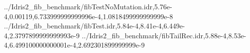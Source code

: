 \documentclass[
]{article}
\newenvironment{Shaded}{}{}
\newcommand{\DataTypeTok}[1]{\textcolor[rgb]{0.56,0.13,0.00}{#1}}
\newcommand{\FloatTok}[1]{\textcolor[rgb]{0.25,0.63,0.44}{#1}}
\newcommand{\NormalTok}[1]{#1}
\newcommand{\OperatorTok}[1]{\textcolor[rgb]{0.40,0.40,0.40}{#1}}
\begin{document}
\begin{Shaded}
\begin{Highlighting}[]
\OperatorTok{../}\DataTypeTok{Idris2\_fib\_benchmark}\OperatorTok{/}\NormalTok{fibTestNoMutation}\OperatorTok{.}\NormalTok{idr,}\FloatTok{5.76e{-}4}\NormalTok{,}\FloatTok{0.00119}\NormalTok{,}\FloatTok{6.733999999999996e{-}4}\NormalTok{,}\FloatTok{1.0818499999999999e{-}8}
\OperatorTok{../}\DataTypeTok{Idris2\_fib\_benchmark}\OperatorTok{/}\NormalTok{fibTest}\OperatorTok{.}\NormalTok{idr,}\FloatTok{5.84e{-}4}\NormalTok{,}\FloatTok{8.41e{-}4}\NormalTok{,}\FloatTok{6.449e{-}4}\NormalTok{,}\FloatTok{2.3797899999999993e{-}9}
\OperatorTok{../}\DataTypeTok{Idris2\_fib\_benchmark}\OperatorTok{/}\NormalTok{fibTailRec}\OperatorTok{.}\NormalTok{idr,}\FloatTok{5.88e{-}4}\NormalTok{,}\FloatTok{8.53e{-}4}\NormalTok{,}\FloatTok{6.499100000000001e{-}4}\NormalTok{,}\FloatTok{2.692301899999999e{-}9}


\end{Highlighting}
\end{Shaded}
\end{document}
